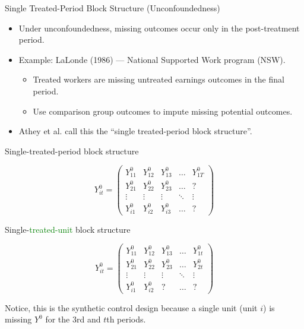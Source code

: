 \documentclass{beamer}
\begin{document}
\begin{frame}{Single Treated-Period Block Structure (Unconfoundedness)}
\small
\begin{itemize}
  \item Under unconfoundedness, missing outcomes occur only in the post-treatment period.
  \item Example: LaLonde (1986) — National Supported Work program (NSW).
  \begin{itemize}
    \item Treated workers are missing untreated earnings outcomes in the final period.
    \item Use comparison group outcomes to impute missing potential outcomes.
  \end{itemize}
  \item Athey et al. call this the ``single treated-period block structure''.
\end{itemize}
\end{frame}



\begin{frame}{Single-treated-period block structure}

\begin{center}
\[ Y^0_{it}  =\begin{pmatrix}
    Y^0_{11} & Y^0_{12} & Y^0_{13} & \dots  &Y^0_{1T} \\
    Y^0_{21} & Y^0_{22} & Y^0_{23} & \dots  & ? \\
    \vdots & \vdots & \vdots & \ddots & \vdots \\
    Y^0_{i1} & Y^0_{i2} & Y^0_{i3} & \dots  & ?
\end{pmatrix}\]
\end{center}

\end{frame}


\begin{frame}{Single-\textcolor{green}{treated-unit} block structure}

\begin{center}
\[ Y^0_{it}  =\begin{pmatrix}
    Y^0_{11} & Y^0_{12} & Y^0_{13} & \dots  & Y^0_{1t} \\
    Y^0_{21} & Y^0_{22} & Y^0_{23} & \dots  & Y^0_{2t}  \\
    \vdots & \vdots & \vdots & \ddots & \vdots \\
    Y^0_{i1} & Y^0_{i2} & ? & \dots  & ?
\end{pmatrix}\]
\end{center}

Notice, this is the synthetic control design because a single unit (unit $i$) is missing $Y^0$ for the 3rd and $t$th periods.

\end{frame}
\end{document}
